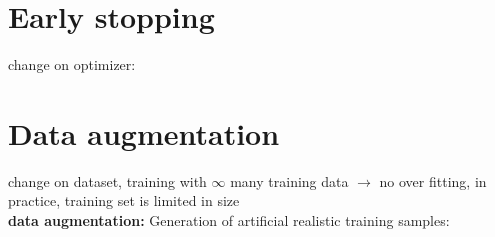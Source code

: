 \section{Early stopping}
change on optimizer:\\
\section{Data augmentation} 
change on dataset, training with $ \infty $ many training data $\rightarrow$ no over fitting, in practice, training set is limited in size\\
\textbf{data augmentation:} Generation of artificial realistic training samples: 